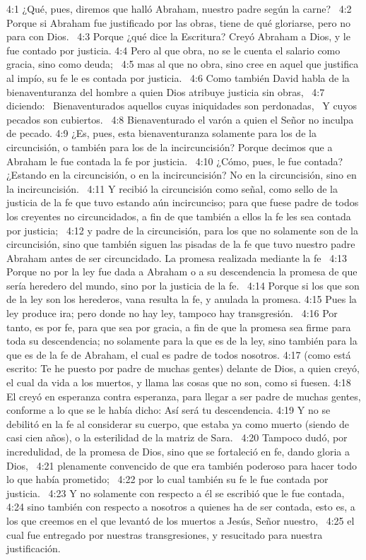 4:1 ¿Qué, pues, diremos que halló Abraham, nuestro padre según la carne?  
4:2 Porque si Abraham fue justificado por las obras, tiene de qué gloriarse, pero no para con Dios.  
4:3 Porque ¿qué dice la Escritura? Creyó Abraham a Dios, y le fue contado por justicia. 
4:4 Pero al que obra, no se le cuenta el salario como gracia, sino como deuda;  
4:5 mas al que no obra, sino cree en aquel que justifica al impío, su fe le es contada por justicia.  
4:6 Como también David habla de la bienaventuranza del hombre a quien Dios atribuye justicia sin obras,  
4:7 diciendo:  
Bienaventurados aquellos cuyas iniquidades son perdonadas,  
Y cuyos pecados son cubiertos.  
4:8 Bienaventurado el varón a quien el Señor no inculpa de pecado. 
4:9 ¿Es, pues, esta bienaventuranza solamente para los de la circuncisión, o también para los de la incircuncisión? Porque decimos que a Abraham le fue contada la fe por justicia.  
4:10 ¿Cómo, pues, le fue contada? ¿Estando en la circuncisión, o en la incircuncisión? No en la circuncisión, sino en la incircuncisión.  
4:11 Y recibió la circuncisión como señal, como sello de la justicia de la fe que tuvo estando aún incircunciso; para que fuese padre de todos los creyentes no circuncidados, a fin de que también a ellos la fe les sea contada por justicia;  
4:12 y padre de la circuncisión, para los que no solamente son de la circuncisión, sino que también siguen las pisadas de la fe que tuvo nuestro padre Abraham antes de ser circuncidado. 
La promesa realizada mediante la fe  
4:13 Porque no por la ley fue dada a Abraham o a su descendencia la promesa de que sería heredero del mundo, sino por la justicia de la fe.  
4:14 Porque si los que son de la ley son los herederos, vana resulta la fe, y anulada la promesa. 
4:15 Pues la ley produce ira; pero donde no hay ley, tampoco hay transgresión.  
4:16 Por tanto, es por fe, para que sea por gracia, a fin de que la promesa sea firme para toda su descendencia; no solamente para la que es de la ley, sino también para la que es de la fe de Abraham, el cual es padre de todos nosotros. 
4:17 (como está escrito: Te he puesto por padre de muchas gentes) delante de Dios, a quien creyó, el cual da vida a los muertos, y llama las cosas que no son, como si fuesen. 
4:18 El creyó en esperanza contra esperanza, para llegar a ser padre de muchas gentes, conforme a lo que se le había dicho: Así será tu descendencia. 
4:19 Y no se debilitó en la fe al considerar su cuerpo, que estaba ya como muerto (siendo de casi cien años), o la esterilidad de la matriz de Sara.  
4:20 Tampoco dudó, por incredulidad, de la promesa de Dios, sino que se fortaleció en fe, dando gloria a Dios,  
4:21 plenamente convencido de que era también poderoso para hacer todo lo que había prometido;  
4:22 por lo cual también su fe le fue contada por justicia.  
4:23 Y no solamente con respecto a él se escribió que le fue contada,  
4:24 sino también con respecto a nosotros a quienes ha de ser contada, esto es, a los que creemos en el que levantó de los muertos a Jesús, Señor nuestro,  
4:25 el cual fue entregado por nuestras transgresiones, y resucitado para nuestra justificación.  
